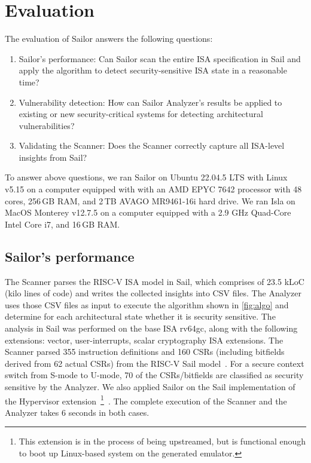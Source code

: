 \section{Evaluation}
\label{sec:eval}

The evaluation of Sailor answers the following questions: 

\begin{enumerate}
    \item Sailor's performance: Can Sailor scan the entire ISA specification in Sail and apply the algorithm to detect security-sensitive ISA state in a reasonable time? 
    \item Vulnerability detection: How can Sailor Analyzer's results be applied to existing or new security-critical systems for detecting architectural vulnerabilities? 
    \item Validating the Scanner: Does the Scanner correctly capture all ISA-level insights from Sail? 
\end{enumerate}

 To answer above questions, we ran Sailor on Ubuntu 22.04.5 LTS with Linux v5.15 on a computer equipped with with an AMD EPYC 7642 processor with 48 cores, 256\,GB RAM, and 2\,TB AVAGO MR9461-16i hard drive. We ran Isla on MacOS Monterey v12.7.5
on a computer equipped with a 2.9 GHz Quad-Core Intel Core i7, and 16\,GB RAM.



\subsection{Sailor's performance}
The Scanner parses the RISC-V ISA model in Sail, which comprises of 23.5 kLoC (kilo lines of code) and writes the collected insights into CSV files. 
The Analyzer uses those CSV files as input to execute the algorithm shown in \autoref{fig:algo} and determine for each architectural state whether it is security sensitive. 
The analysis in Sail was performed on the base ISA \ie{} rv64gc, along with the following extensions: vector, user-interrupts, scalar cryptography ISA extensions. 
The Scanner parsed 355 instruction definitions and 160 CSRs (including bitfields derived from 62 actual CSRs) from the RISC-V Sail model~\cite{sail-riscv}.  
For a secure context switch from S-mode to U-mode, 70 of the CSRs/bitfields are classified as security sensitive by the Analyzer. 
We also applied Sailor on the Sail implementation of the Hypervisor extension~\footnote{This extension is in the process of being upstreamed, but is functional enough to boot up Linux-based system on the generated emulator.}~\cite{sail-hext-git, sail-hext}. 
The complete execution of the Scanner and the Analyzer takes 6 seconds in both cases. 

